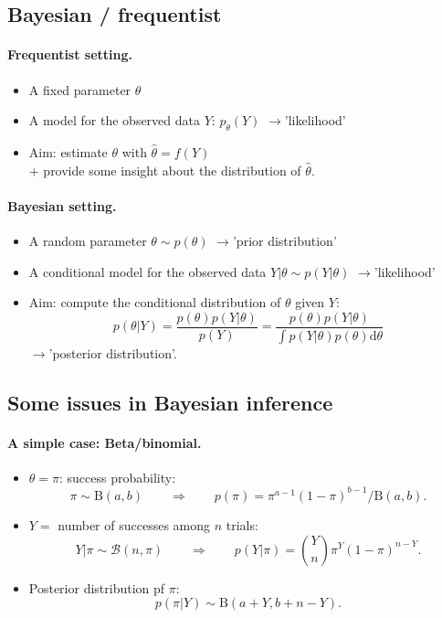 \documentclass[12pt]{article}
\newcommand{\dd}{\text{d}}
\newcommand{\ra}{$\rightarrow$\xspace}
\begin{document}
\subsection{Bayesian / frequentist}

\paragraph{Frequentist setting.}
\begin{itemize}
 \item A fixed parameter $\theta$
 \item A model for the observed data $Y$: $p_\theta(Y)$ \ra 'likelihood'
 \item Aim: estimate $\theta$ with $\widehat{\theta} = f(Y)$ \\
 + provide some insight about the distribution of $\widehat{\theta}$.
\end{itemize}

\paragraph{Bayesian setting.}
\begin{itemize}
 \item A random parameter $\theta \sim p(\theta)$ \ra 'prior distribution'
 \item A conditional model for the observed data $Y|\theta \sim p(Y|\theta)$ \ra 'likelihood'
 \item Aim: compute the conditional distribution of $\theta$ given $Y$:
 $$
 p(\theta|Y) = \frac{p(\theta) p(Y|\theta)}{p(Y)} = \frac{p(\theta) p(Y|\theta)}{\int p(Y|\theta) p(\theta) \dd \theta}
 $$
 \ra 'posterior distribution'.
\end{itemize}

\subsection{Some issues in Bayesian inference}

\paragraph{A simple case: Beta/binomial.}
\begin{itemize}
 \item $\theta = \pi$: success probability: 
 $$
 \pi \sim \text{B}(a, b) 
 \qquad \Rightarrow \qquad
 p(\pi) = \pi^{a-1} (1-\pi)^{b-1} / \text{B}(a, b).
 $$
 \item $Y =$ number of successes among $n$ trials:
 $$
 Y | \pi \sim \mathcal{B}(n, \pi)
 \qquad \Rightarrow \qquad
 p(Y|\pi) = \binom{Y}{n} \pi^Y (1-\pi)^{n-Y}.
 $$
 \item Posterior distribution pf $\pi$:
 $$
 p(\pi|Y) \sim \text{B}(a+Y, b+n-Y).
 $$
\end{itemize}
\end{document}
